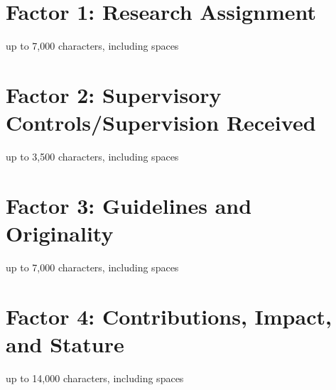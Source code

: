 \documentclass[12pt]{article}
\begin{document}


\newpage

\section*{Factor 1: Research Assignment}

\vspace{-0.2cm}
\begin{center}
  {\color{red} \footnotesize{up to 7,000 characters, including spaces}}\\
\end{center}




\newpage

\section*{Factor 2: Supervisory Controls/Supervision Received}

\vspace{-0.2cm}
\begin{center}
  {\color{red} \footnotesize{up to 3,500 characters, including spaces}}\\
\end{center}




\newpage

\section*{Factor 3: Guidelines and Originality}

\vspace{-0.2cm}
\begin{center}
  {\color{red} \footnotesize{up to 7,000 characters, including spaces}}\\
\end{center}



\newpage

\section*{Factor 4: Contributions, Impact, and Stature}

\vspace{-0.2cm}
\begin{center}
  {\color{red} \footnotesize{up to 14,000 characters, including spaces}}\\
\end{center}
\end{document}

